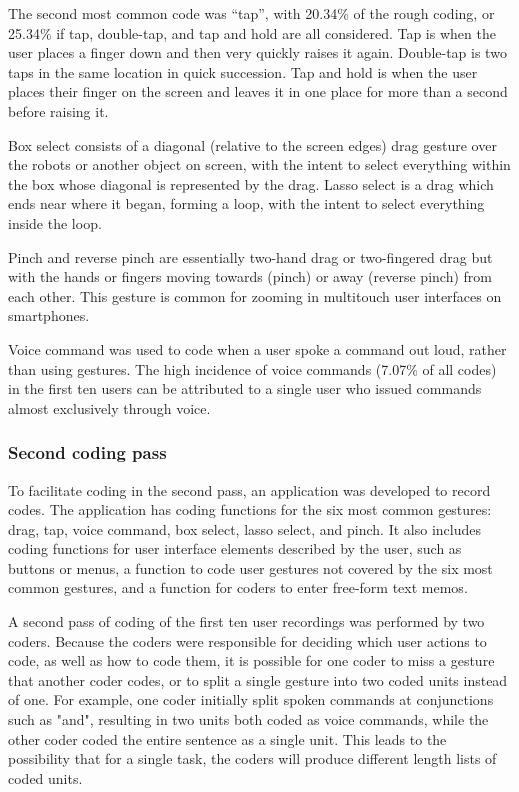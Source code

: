 The second most common code was ``tap'', with 20.34\% of the rough coding, or 25.34\% if tap, double-tap, and tap and hold are all considered. Tap is when the user places a finger down and then very quickly raises it again. Double-tap is two taps in the same location in quick succession. Tap and hold is when the user places their finger on the screen and leaves it in one place for more than a second before raising it. 

Box select consists of a diagonal (relative to the screen edges) drag gesture over the robots or another object on screen, with the intent to select everything within the box whose diagonal is represented by the drag. 
Lasso select is a drag which ends near where it began, forming a loop, with the intent to select everything inside the loop. 

Pinch and reverse pinch are essentially two-hand drag or two-fingered drag but with the hands or fingers moving towards (pinch) or away (reverse pinch) from each other.
This gesture is common for zooming in multitouch user interfaces on smartphones. 

Voice command was used to code when a user spoke a command out loud, rather than using gestures. The high incidence of voice commands (7.07\% of all codes) in the first ten users can be attributed to a single user who issued commands almost exclusively through voice. 




 
\subsubsection{Second coding pass}

To facilitate coding in the second pass, an application was developed to record codes. 
The application has coding functions for the six most common gestures: drag, tap, voice command, box select, lasso select, and pinch. 
It also includes coding functions for user interface elements described by the user, such as buttons or menus, a function to code user gestures not covered by the six most common gestures, and a function for coders to enter free-form text memos. 


A second pass of coding of the first ten user recordings was performed by two coders. 
Because the coders were responsible for deciding which user actions to code, as well as how to code them, it is possible for one coder to miss a gesture that another coder codes, or to split a single gesture into two coded units instead of one. 
For example, one coder initially split spoken commands at conjunctions such as "and", resulting in two units both coded as voice commands, while the other coder coded the entire sentence as a single unit. 
This leads to the possibility that for a single task, the coders will produce different length lists of coded units. 

